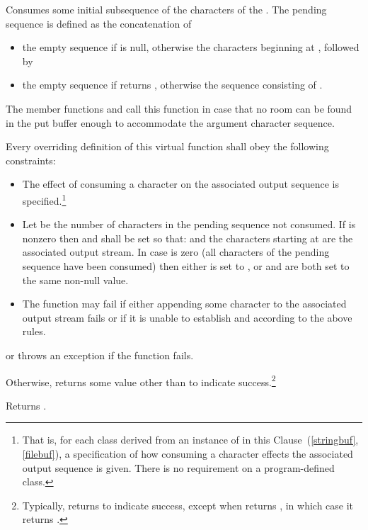 \begin{itemdescr}
\pnum
\effects
Consumes some initial subsequence of the characters of the
.
The pending sequence is defined as the concatenation of
\begin{itemize}
\item
the empty sequence if  is null, otherwise the
characters beginning at
, followed by
\item
the empty sequence
if
returns
, otherwise the sequence consisting of .
\end{itemize}

\pnum
\remarks
The member functions
and
call this function in case that
no room can be found in the put buffer enough to accommodate the
argument character sequence.

\pnum
\requires
Every overriding definition of this virtual function
shall obey the following constraints:
\begin{itemize}
\item
The effect of consuming a character on the associated output sequence is
specified.\footnote{That is, for each class derived from an instance of
in this Clause~(\ref{stringbuf},
\ref{filebuf}),
a specification of how consuming a character effects the associated output sequence is given.
There is no requirement on a program-defined class.}
\item
Let
be the number of characters in the pending sequence not consumed.
If
is nonzero then
and
shall be set so that:
and the  characters starting at
are the associated output stream.
In case   is zero (all characters of the pending sequence have been consumed)
then either
is set to
,
or
and
are both set to the same non-null value.
\item
The function may fail if either
appending some character to the associated output stream fails or
if it is unable to establish
and
according to the above rules.
\end{itemize}

\pnum
\returns
{}
or throws an exception
if the function fails.

Otherwise,
returns some value other than
to indicate success.\footnote{Typically,
returns  to indicate success, except when
returns
,
in which case it returns
.}

\pnum
{}
Returns
.
\end{itemdescr}

